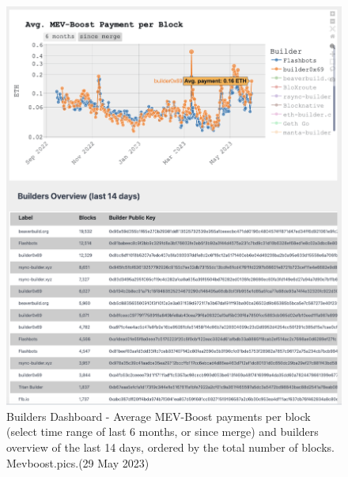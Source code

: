 \documentclass[UTF8]{article}
\begin{document}
{\begin{figure}[htbp]
\begin{center}
\includegraphics[width=0.9\linewidth]{images/mevbuilder4}
\caption{Builders Dashboard - Average MEV-Boost payments per block (select time range of last 6 months, or since merge) and builders overview of the last 14 days, ordered by the total number of blocks. Mevboost.pics.(29 May 2023)}
\label{fig:mevbuilder4}
\end{center}
\end{figure}

}
\end{document}
